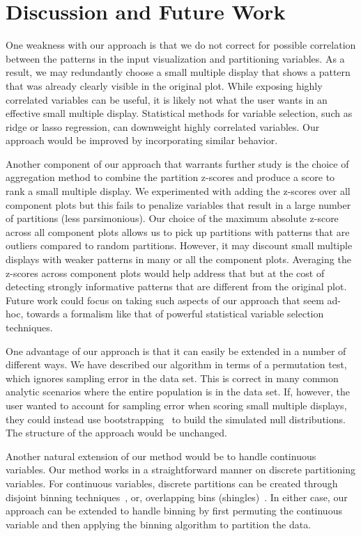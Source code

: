 \section{Discussion and Future Work}
\label{sec:discussion}
One weakness with our approach is that we do not correct for possible correlation between the patterns in the input visualization and partitioning variables. As a result, we may redundantly choose a small multiple display that shows a pattern that was already clearly visible in the original plot. While exposing highly correlated variables can be useful, it is likely not what the user wants in an effective small multiple display. Statistical methods for variable selection, such as ridge or lasso regression, can downweight highly correlated variables. Our approach would be improved by incorporating similar behavior. 

Another component of our approach that warrants further study is the choice of aggregation method to combine the partition z-scores and produce a score to rank a small multiple display. We experimented with adding the z-scores over all component plots but this fails to penalize variables that result in a large number of partitions (less parsimonious). Our choice of the maximum absolute z-score across all component plots allows us to pick up partitions with patterns that are outliers compared to random partitions. However, it may discount small multiple displays with weaker patterns in many or all the component plots. Averaging the z-scores across component plots would help address that but at the cost of detecting strongly informative patterns that are different from the original plot. Future work could focus on taking such aspects of our approach that seem ad-hoc, towards a formalism like that of powerful statistical variable selection techniques.%

One advantage of our approach is that it can easily be extended in a number of different ways. We have described our algorithm in terms of a permutation test, which ignores sampling error in the data set. This is correct in many common analytic scenarios where the entire population is in the data set. If, however, the user wanted to account for sampling error when scoring small multiple displays, they could instead use bootstrapping~\cite{Efron1994} to build the simulated null distributions. The structure of the approach would be unchanged.

Another natural extension of our method would be to handle continuous variables. Our method works in a straightforward manner on discrete partitioning variables. For continuous variables, discrete partitions can be created through disjoint binning techniques~\cite{Freedman1981,Scott2009}, or, overlapping bins (shingles)~\cite{Becker1996}. In either case, our approach can be extended to handle binning by first permuting the continuous variable and then applying the binning algorithm to partition the data.

